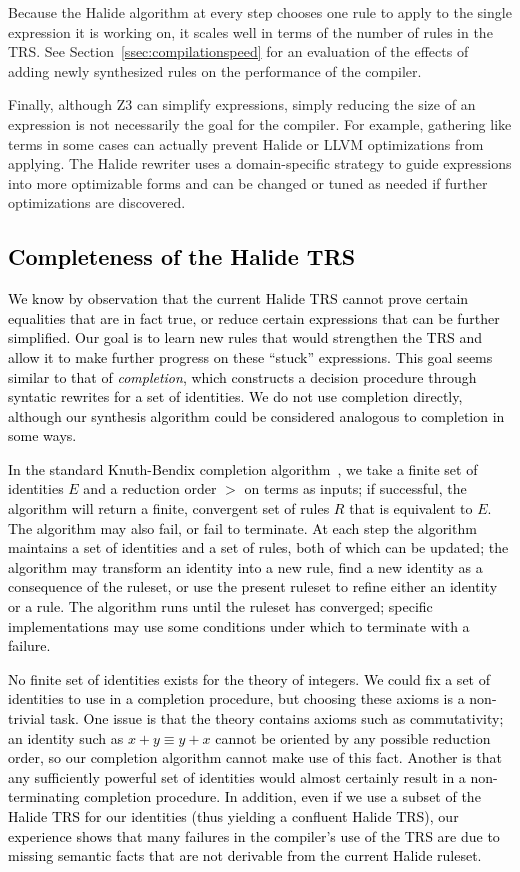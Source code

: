 \documentclass[acmsmall]{acmart}\settopmatter{}
\newcommand{\modified}[1]{\textcolor{black}{{#1}}}
\begin{document}
Because the Halide algorithm at every step chooses one rule to apply to the single expression it is working on, it scales well in terms of the number of rules in the TRS. See Section~\ref{ssec:compilationspeed} for an evaluation of the effects of adding newly synthesized rules on the performance of the compiler. 

Finally, although Z3 can simplify expressions, simply reducing the size of an expression is not necessarily the goal for the compiler. For example, gathering like terms in some cases can actually prevent Halide or LLVM optimizations from applying. The Halide rewriter uses a domain-specific strategy to guide expressions into more optimizable forms and can be changed or tuned as needed if further optimizations are discovered. 

\subsection{\modified{Completeness of the Halide TRS}}
\label{sec:completion}

\modified{We know by observation that the current Halide TRS cannot prove certain equalities 
that are in fact true, or reduce certain expressions that can be further simplified. 
Our goal is to learn new rules that would strengthen the TRS and allow it to make
further progress on these ``stuck'' expressions. This goal seems similar to that of 
\emph{completion}, which constructs a decision procedure through syntatic rewrites
for a set of identities. We do not use completion directly, although
our synthesis algorithm could be considered analogous to completion in some ways.}

\modified{In the standard Knuth-Bendix completion algorithm~\cite{knuth1983simple}, we take a
finite set of identities $E$ and a reduction order $>$ on terms as inputs; if successful, the
algorithm will return a finite, convergent set of rules $R$ that is equivalent to 
$E$. The algorithm may also fail, or fail to terminate. At each step the algorithm
maintains a set of identities and a set of rules, both of which can be updated; the 
algorithm may transform an identity into a new rule, find a new identity as a 
consequence of the ruleset, or use the present ruleset to refine either an identity 
or a rule. The algorithm runs until the ruleset has converged; specific implementations
may use some conditions under which to terminate with a failure.}

\modified{No finite set of identities exists for the theory of integers. We could
fix a set of identities to use in a completion procedure, but choosing these axioms
is a non-trivial task. One issue is that the theory contains axioms such as commutativity;
an identity such as $x + y \equiv y + x$ cannot be oriented by any possible reduction 
order, so our completion algorithm cannot make use of this fact. Another is that any
sufficiently powerful set of identities would almost certainly result in a non-terminating
completion procedure.  In addition, even if we use a subset of the Halide TRS for our
identities (thus yielding a confluent Halide TRS), our experience shows that many
failures in the compiler's use of the TRS are due to missing semantic facts that are not
derivable from the current Halide ruleset.}
\end{document}
